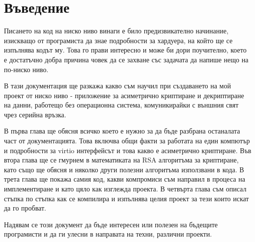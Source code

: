 \section*{Въведение}
Писането на код на ниско ниво винаги е било предизвикателно начинание, изискващо от програмиста да знае подробности за хардуера, на който ще се изпълнява кодът му. Това го прави интересно и може би дори поучително, което е достатъчно добра причина човек да се захване със задачата да напише нещо на по-ниско ниво.

В тази документация ще разкажа какво съм научил при създаването на мой проект от ниско ниво - приложение за асиметрично криптиране и декриптиране на данни, работещо без операционна система, комуникирайки с външния свят чрез серийна връзка.

В първа глава ще обясня всичко което е нужно за да бъде разбрана останалата част от документацията. Това включва общи факти за работата на един компютър и подробности за virtio интерфейсът и това какво е асиметрично криптиране. Във втора глава ще се гмурнем в математиката на RSA алгоритъма за криптиране, като също ще обясня и няколко други полезни алгоритъма използвани в кода. В трета глава ще покажа самия код, какви компромиси съм направил в процеса на имплементиране и като цяло как изглежда проекта. В четвърта глава съм описал стъпка по стъпка как се компилира и изпълнява целия проект за тези които искат да го пробват.

Надявам се този документ да бъде интересен или полезен на бъдещите програмисти и да ги улесни в направата на техни, различни проекти.
